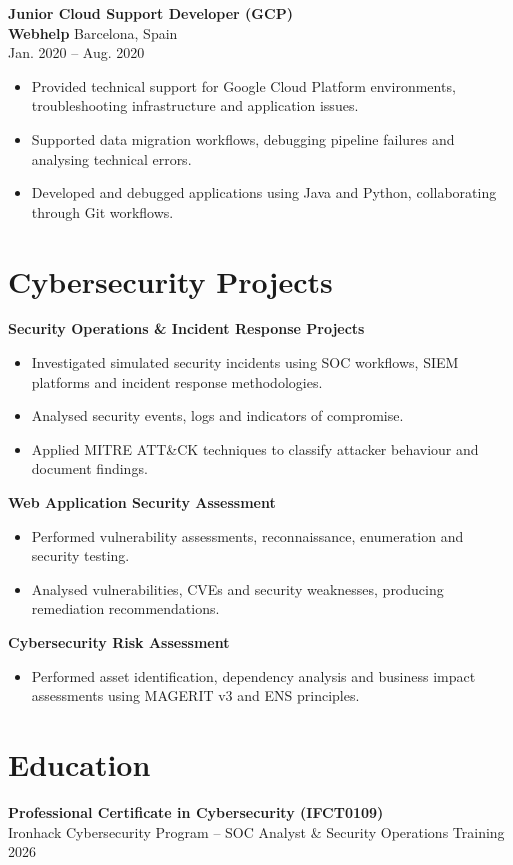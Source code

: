 \documentclass[10pt,a4paper]{article}
\begin{document}
\textbf{Junior Cloud Support Developer (GCP)}\\
\textbf{Webhelp} \hfill Barcelona, Spain\\
Jan. 2020 -- Aug. 2020

\begin{itemize}
\item Provided technical support for Google Cloud Platform environments, troubleshooting infrastructure and application issues.
\item Supported data migration workflows, debugging pipeline failures and analysing technical errors.
\item Developed and debugged applications using Java and Python, collaborating through Git workflows.
\end{itemize}

\section*{Cybersecurity Projects}
\textbf{Security Operations \& Incident Response Projects}
\begin{itemize}
\item Investigated simulated security incidents using SOC workflows, SIEM platforms and incident response methodologies.
\item Analysed security events, logs and indicators of compromise.
\item Applied MITRE ATT\&CK techniques to classify attacker behaviour and document findings.
\end{itemize}

\textbf{Web Application Security Assessment}
\begin{itemize}
\item Performed vulnerability assessments, reconnaissance, enumeration and security testing.
\item Analysed vulnerabilities, CVEs and security weaknesses, producing remediation recommendations.
\end{itemize}

\textbf{Cybersecurity Risk Assessment}
\begin{itemize}
\item Performed asset identification, dependency analysis and business impact assessments using MAGERIT v3 and ENS principles.
\end{itemize}

\section*{Education}
\textbf{Professional Certificate in Cybersecurity (IFCT0109)}\\
Ironhack Cybersecurity Program -- SOC Analyst \& Security Operations Training\\
2026
\end{document}
